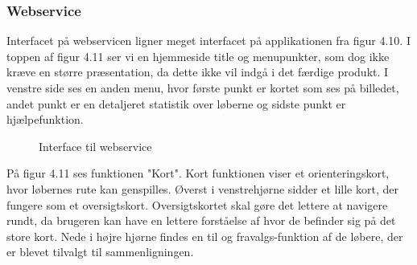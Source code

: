 \subsubsection{Webservice}
Interfacet på webservicen ligner meget interfacet på applikationen fra figur 4.10. I toppen af figur 4.11 ser vi en hjemmeside title og menupunkter, som dog ikke kræve en større præsentation, da dette ikke vil indgå i det færdige produkt. I venstre side ses en anden menu, hvor første punkt er kortet som ses på billedet, andet punkt er en detaljeret statistik over løberne og sidste punkt er hjælpefunktion.
\begin{figure}[h]
	\centering
	\caption{Interface til webservice}
\end{figure}

På figur 4.11 ses funktionen "Kort". Kort funktionen viser et orienteringskort, hvor løbernes rute kan genspilles. Øverst i venstrehjørne sidder et lille kort, der fungere som et oversigtskort. Oversigtskortet skal gøre det lettere at navigere rundt, da brugeren kan have en lettere forståelse af hvor de befinder sig på det store kort. Nede i højre hjørne findes en til og fravalgs-funktion af de løbere, der er blevet tilvalgt til sammenligningen.


